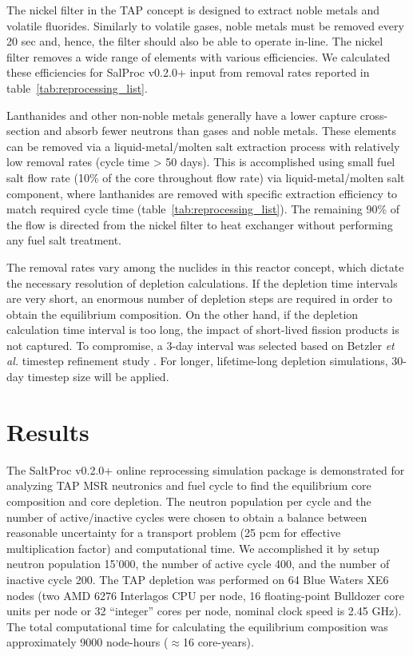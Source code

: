 \documentclass[12pt]{article} %
\begin{document}
The nickel filter in the \gls{TAP} concept is designed to extract noble metals 
and volatile fluorides. Similarly to volatile gases, noble metals must be 
removed every 20 sec and, hence, the filter should also be able to operate 
in-line. The nickel filter removes a wide range of elements with various 
efficiencies. We calculated these efficiencies for SalProc v0.2.0+ input 
from removal rates reported in table~\ref{tab:reprocessing_list}.

Lanthanides and other non-noble metals generally have a lower capture 
cross-section and absorb fewer neutrons than gases and noble metals. These 
elements can be removed via a liquid-metal/molten salt extraction process with 
relatively low removal rates (cycle time > 50 days). This is accomplished 
using small fuel salt flow rate (10\% of the core throughout flow rate) via 
liquid-metal/molten salt component, where lanthanides are removed with 
specific extraction efficiency to match required cycle time  
(table~\ref{tab:reprocessing_list}). The remaining 90\% of the flow is 
directed  from the nickel filter to heat exchanger without performing any fuel 
salt treatment.

The removal rates vary among the nuclides in this reactor concept, which 
dictate the necessary resolution of depletion calculations. If the depletion 
time intervals are very short, an enormous number of depletion steps are 
required in order to obtain the equilibrium composition. On the other hand, if 
the depletion calculation time interval is too long, the impact of short-lived 
fission products is not captured. To compromise, a 3-day interval was selected 
based on Betzler \emph{et al.} timestep refinement study  
\cite{betzler_assessment_2017}. For longer, lifetime-long depletion  
simulations, 30-day timestep size will be applied.

\section{Results}
The SaltProc v0.2.0+ online reprocessing simulation package is demonstrated for 
analyzing \gls{TAP} \gls{MSR} neutronics and fuel cycle to find the equilibrium core composition and core depletion. The neutron population per cycle and the number 
of active/inactive cycles were chosen to obtain a balance between reasonable 
uncertainty for a transport problem (25 pcm for effective multiplication factor) 
and computational time. We accomplished it by setup neutron population 15'000, 
the number of active cycle 400, and the number of inactive cycle 200. 
The \gls{TAP} depletion was performed on 64 Blue Waters 
XE6 nodes (two AMD 6276 Interlagos CPU per node, 16 floating-point Bulldozer 
core units per node or 32 ``integer'' cores per node, nominal clock speed is 
2.45 GHz). The total computational time for calculating the equilibrium 
composition was approximately 9000 node-hours ($\approx$16 core-years).
\end{document}
